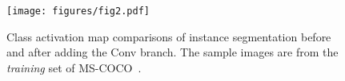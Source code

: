 \begin{figure}[t]
\centering
\texttt{[image: figures/fig2.pdf]}
\vspace{-4mm}
\caption{Class activation map comparisons of instance segmentation before and after adding the Conv branch. The sample images are from the \emph{training} set of MS-COCO~\citep{caesar2018coco}.}
\vspace{-4mm}
\label{figs1}
\end{figure}